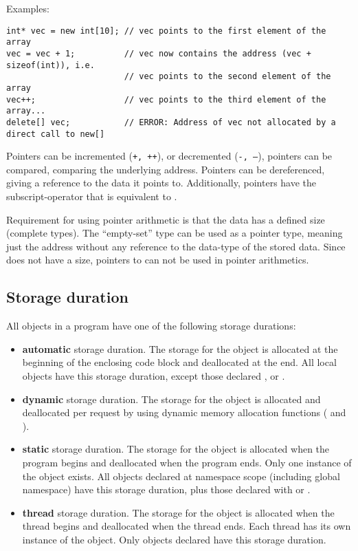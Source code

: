 Examples:
\begin{verbatim}
int* vec = new int[10]; // vec points to the first element of the array
vec = vec + 1;          // vec now contains the address (vec + sizeof(int)), i.e.
                        // vec points to the second element of the array
vec++;                  // vec points to the third element of the array...
delete[] vec;           // ERROR: Address of vec not allocated by a direct call to new[]
\end{verbatim}

Pointers can be incremented (\texttt{+, ++}), or decremented (\texttt{-, --}), pointers can be compared, comparing the underlying address.
Pointers can be dereferenced, giving a reference to the data it points to. Additionally, pointers have the subscript-operator \cpp{[n]} that is
equivalent to .

Requirement for using pointer arithmetic is that the data has a defined size (complete types). The ``empty-set'' type  can be used as a pointer type,
meaning just the address without any reference to the data-type of the stored data. Since  does not have a size, pointers to  can not
be used in pointer arithmetics.


\subsection{Storage duration}
All objects in a program have one of the following storage durations:
\begin{itemize}
  \item \textbf{automatic} storage duration. The storage for the object is allocated at the beginning of the enclosing code block and deallocated at the end. All local objects have this storage duration, except those declared ,  or .

  \item \textbf{dynamic} storage duration. The storage for the object is allocated and deallocated per request by using dynamic memory allocation functions ( and ).

  \item \textbf{static} storage duration. The storage for the object is allocated when the program begins and deallocated when the program ends. Only one instance of the object exists. All objects declared at namespace scope (including global namespace) have this storage duration, plus those declared with  or .

  \item \textbf{thread} storage duration. The storage for the object is allocated when the thread begins and deallocated when the thread ends. Each thread has its own instance of the object. Only objects declared  have this storage duration.
\end{itemize}

